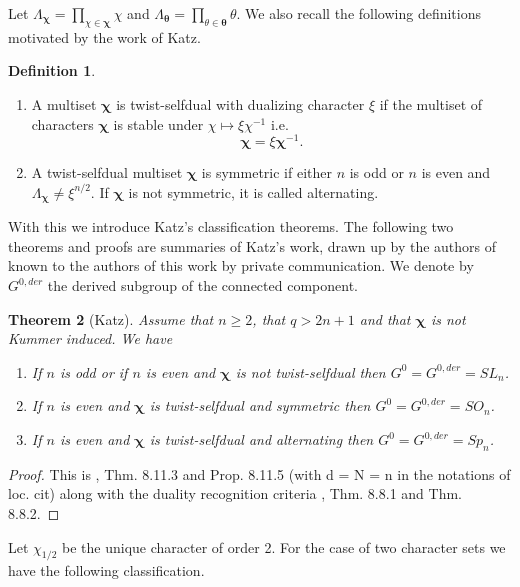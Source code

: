 \documentclass[12pt]{amsart}
\theoremstyle{plain}
\newtheorem{thm}{Theorem}[section]
\theoremstyle{definition}
\newtheorem{defi}[thm]{Definition}
\theoremstyle{remark}
\numberwithin{equation}{section}
\renewcommand{\geq}{\geqslant}
\begin{document}
Let $\Lambda_{\bm\chi}=\prod_{\chi\in \bm\chi}\chi$ and $\Lambda_{\bm\theta}=\prod_{\theta\in \bm\theta}\theta.$ We also recall the following definitions motivated by the work of Katz.

\begin{defi}
    \begin{enumerate}
        \item  A multiset $\bm{\chi}$ is twist-selfdual with dualizing character $\xi$ if the multiset of characters $\bm{\chi}$ is stable under $\chi \mapsto \xi\chi^{-1}$ i.e.  $$\bm{\chi}=\xi\bm\chi^{-1}.$$ 
\item  A twist-selfdual multiset $\bm{\chi}$ is symmetric if either $n$ is odd or $n$ is even and $\Lambda_{\bm \chi}\neq \xi^{n/2}$. If $\bm \chi$ is not symmetric, it is called alternating.
    \end{enumerate}
\end{defi}

With this we introduce Katz's classification theorems. The following two theorems and proofs are summaries of Katz's work, drawn up by the authors of \cite{FKMSbilinear} known to the authors of this work by private communication. We denote by $G^{0,der}$ the derived subgroup of the connected component. 

\begin{thm}[Katz]\label{thm: Katz one set characters}
Assume that $n\geq 2$, that $q>2n+1$ and that $\bm{\chi}$ is not Kummer induced. 
We have
\begin{enumerate}
    \item  If $n$ is odd or if $n$ is even and $\bm{\chi}$ is not twist-selfdual then $G^0 = G^{0,der} = SL_n$.
\item  If $n$ is even and $\bm{\chi}$ is twist-selfdual and symmetric then $G^0 = G^{0,der} = SO_n$.
\item  If $n$ is even and $\bm{\chi}$ is twist-selfdual and alternating then $G^0 = G^{0,der} = Sp_n$.
\end{enumerate}
\end{thm}
\begin{proof}
This is \cite{Katzbook}, Thm. 8.11.3 and Prop. 8.11.5 (with d = N = n in the notations of loc.
cit) along with the duality recognition criteria \cite{Katzbook}, Thm. 8.8.1 and Thm. 8.8.2.
\end{proof}
Let $\chi_{1/2}$ be the unique character of order 2. 
For the case of two character sets we have the following classification.
\end{document}
